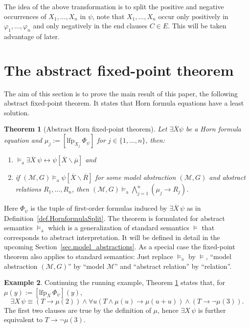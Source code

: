 \documentclass[acmsmall]{acmart}
\theoremstyle{plain}
\newtheorem{theorem}{Theorem}
\theoremstyle{definition}
\newtheorem{example}[theorem]{Example}
\newcommand{\calM}{\mathcal{M}}
\renewcommand{\phi}{\varphi}
\newcommand{\mybar}[1]{\overline{#1}}
\newcommand{\impl}{\rightarrow} %
\newcommand{\lfp}{\mathrm{lfp}} %
\newcommand{\modelsa}{\models_\mathrm{a}} %
\begin{document}
%
The idea of the above transformation is to split the positive and negative occurrences of $X_1,...,X_n$ in $\psi$, note that $X_1,...,X_n$  occur only positively in $\varphi_1,...,\varphi_n$ and only negatively in the end clauses $C \in E$. This will be taken advantage of later.



\section{The abstract fixed-point theorem}\label{sec.afpthm}

The aim of this section is to prove the main result of this paper, the
 following abstract fixed-point theorem. 
 It states that Horn formula equations have a least solution.
%
\begin{theorem}[Abstract Horn fixed-point theorem]\label{thm.abstractFP}
	Let $\exists \mybar{X} \psi$ be a Horn formula equation and $\mu_j := [\lfp_{X_j} ~\Phi_{\psi}]$ for $j \in \{1,...,n\}$, then:
	\begin{enumerate}
		\item $\modelsa \exists \mybar{X}  ~\psi \leftrightarrow \psi[\mybar{X}\backslash \mybar{\mu}]$ and
		\item if $(\calM,G) \modelsa \psi[\mybar{X}\backslash \mybar{R}]$ for some model abstraction $(\calM,G)$ and abstract relations $R_1,...,R_n$, then $(\calM,G) \modelsa \bigwedge_{j=1}^n (\mu_j \rightarrow R_j)$.
	\end{enumerate}
\end{theorem}

Here $\Phi_\psi$ is the tuple of first-order formulas induced by
 $\exists \mybar{X}\, \psi$ as in Definition~\ref{def.HornformulaSplit}.
The theorem is formulated for abstract semantics $\modelsa$
 which is a generalization of standard semantics $\models$ that corresponds
 to abstract interpretation.
It will be defined in detail in the upcoming
 Section~\ref{sec.model_abstractions}.
As a special case the fixed-point theorem also applies to standard
 semantics: Just replace $\modelsa$ by $\models$, ``model abstraction $(\calM,G)$'' by ``model $\calM$'' and ``abstract relation'' by ``relation''.

\begin{example}
Continuing the running example,
%
Theorem \ref{thm.abstractFP} states that, for $\mu(y) := [\lfp_X\, \Phi_\psi](y)$,
\[
\exists X\, \psi \equiv (T\impl \mu(2)) \land \forall u (T\land \mu(u) \impl \mu(u+u)) \land (T\impl \neg \mu(3)).
\]
The first two clauses are true by the definition of $\mu$, hence $\exists X\, \psi$ is
 further equivalent to $T\impl \neg \mu(3)$.
\end{example}
\end{document}
